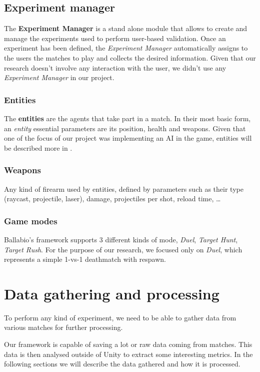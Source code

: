 \subsection{Experiment manager}
The \textbf{Experiment Manager} is a stand alone module that allows to create and manage the experiments used to perform user-based validation. Once an experiment has been defined, the \textit{Experiment Manager} automatically assigns to the users the matches to play and collects the desired information.
Given that our research doesn’t involve any interaction with the user, we didn’t use any \textit{Experiment Manager} in our project.

\subsubsection{Entities}
The \textbf{entities} are the agents that take part in a match.
In their most basic form, an \textit{entity} essential parameters are its position, health and weapons. Given that one of the focus of our project was implementing an AI in the game, entities will be described more in .

\subsubsection{Weapons}
Any kind of firearm used by entities, defined by parameters such as their type (raycast, projectile, laser), damage, projectiles per shot, reload time, …

\subsubsection{Game modes}
Ballabio’s framework supports 3 different kinds of mode, \textit{Duel}, \textit{Target Hunt}, \textit{Target Rush}. For the purpose of our research, we focused only on \textit{Duel}, which represents a simple 1-vs-1 deathmatch with respawn.

\section{Data gathering and processing}
To perform any kind of experiment, we need to be able to gather data from various matches for further processing. 

Our framework is capable of saving a lot or raw data coming from matches. This data is then analysed outside of Unity to extract some interesting metrics. In the following sections we will describe the data gathered and how it is processed.

